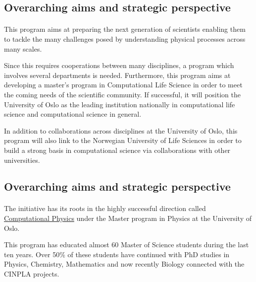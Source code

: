\documentclass[%
twoside,                 %
final,                   %
10pt]{article}
\begin{document}
\subsection{Overarching aims and strategic perspective}

\paragraph{}

This program aims  at preparing the next generation of scientists enabling them to tackle the many challenges posed by understanding physical processes across many scales. 

Since this requires cooperations between many disciplines, a program
which involves several departments is needed. Furthermore, this
program aims at developing a master's program in Computational Life
Science in order to meet the coming needs of the scientific community. If successful, it will
position the University of Oslo as the leading institution
nationally in computational life science and computational science in general. 

In addition to collaborations across disciplines at the University of Oslo, 
this program will also link to the Norwegian University of Life Sciences 
in order to build a strong basis in computational science via collaborations with other universities.




\subsection{Overarching aims and strategic perspective}

\paragraph{}

The initiative has its roots in the highly successful direction called \href{{http://www.uio.no/english/studies/programmes/physics-master/programme-options/computational/index.html}}{Computational Physics}
under the Master program in Physics at the University of Oslo.

This program has educated almost 60 Master of Science students during the last ten years.
Over 50\% of these students have continued with PhD studies in Physics, Chemistry, Mathematics and
now recently Biology connected with the CINPLA projects. 
\end{document}
